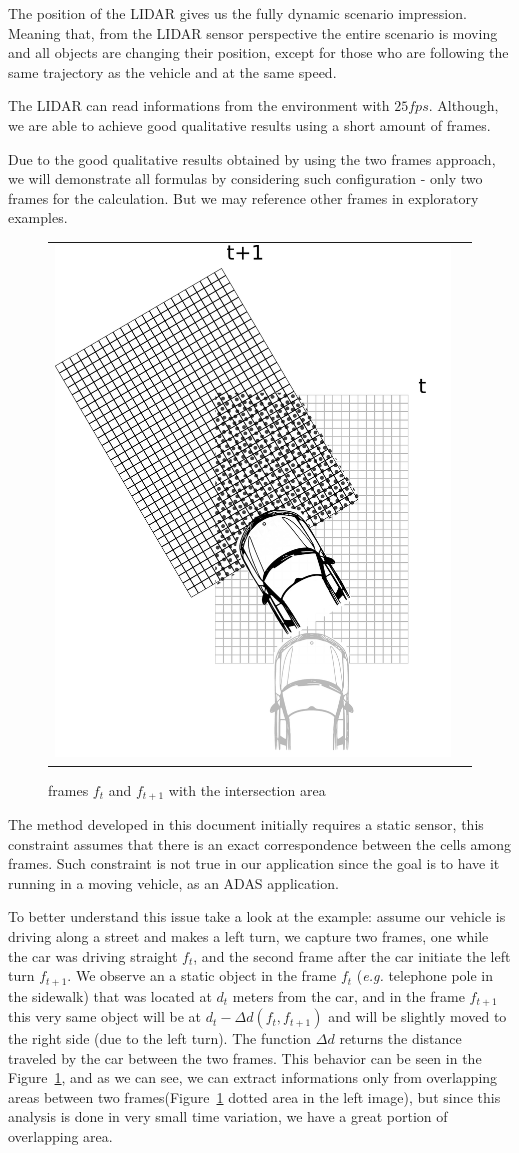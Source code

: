 The position of the LIDAR gives us the fully dynamic scenario impression. Meaning that, from the LIDAR sensor perspective the entire scenario is moving and all objects are changing their position, except for those who are following the same trajectory as the vehicle and at the same speed. 

The LIDAR can read informations from the environment with $25fps$. Although, we are able to achieve good qualitative results using a short amount of frames. 

Due to the good qualitative results obtained by using the two frames approach, we will demonstrate all formulas by considering such configuration - only two frames for the calculation. But we may reference other frames in exploratory examples.


\begin{figure}[h]
   \centering
     \begin{tabular}{lr}
       \includegraphics[width=0.35\columnwidth]{img/fig:motion:algorithm:nonstatic:01}
     \end{tabular}
   \caption{frames $f_t$ and $f_{t+1}$ with the intersection area}
   \label{fig:motion:algorithm:nonstatic:01}
 \end{figure}

The method developed in this document initially requires a static sensor, this constraint assumes that there is an exact correspondence between the cells among frames. Such constraint is not true in our application since the goal is to have it running in a moving vehicle, as an ADAS application. 

To better understand this issue take a look at the example: assume our vehicle is driving along a street and makes a left turn, we capture two frames, one while the car was driving straight $f_t$, and the second frame  after the car initiate the left turn $f_{t+1}$. We observe an a static object in the frame $f_t$ (\textit{e.g.} telephone pole in the sidewalk) that was located at $d_t$ meters from the car, and in the frame $f_{t+1}$ this very same object will be at $d_t-\Delta d(f_t,f_{t+1})$ and will be slightly moved to the right side (due to the left turn). The function $\Delta d$ returns the distance traveled by the car between the two frames. This behavior can be seen in the Figure~\ref{fig:motion:algorithm:nonstatic:01}, and as we can see, we can extract informations only from overlapping areas between two frames(Figure~\ref{fig:motion:algorithm:nonstatic:01} dotted area in the left image), but since this analysis is done in very small time variation, we have a great portion of overlapping area.

